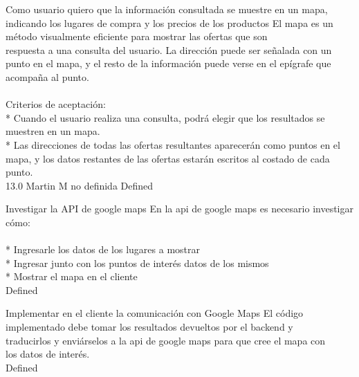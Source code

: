 \vspace{20pt}

	{Como usuario quiero que la información consultada se muestre en un mapa, indicando los lugares de compra y los precios de los productos} %
	{El mapa es un método visualmente eficiente para mostrar las ofertas que son\\
respuesta a una consulta del usuario. La dirección puede ser señalada con un\\
punto en el mapa, y el resto de la información puede verse en el epígrafe que\\
acompaña al punto.\\
  \\
Criterios de aceptación:\\
* Cuando el usuario realiza una consulta, podrá elegir que los resultados se muestren en un mapa.  \\
* Las direcciones de todas las ofertas resultantes aparecerán como puntos en el mapa, y los datos restantes de las ofertas estarán escritos al costado de cada punto.\\
} %
	{} %
	{13.0} %
	{Martin M} %
	{no definida} %
	{Defined} %

		{Investigar la API de google maps} %
		{En la api de google maps es necesario investigar cómo:\\
  \\
* Ingresarle los datos de los lugares a mostrar\\
* Ingresar junto con los puntos de interés datos de los mismos\\
* Mostrar el mapa en el cliente\\
} %
		{} %
		{} %
		{} %
		{Defined} %

		{Implementar en el cliente la comunicación con Google Maps} %
		{El código implementado debe tomar los resultados devueltos por el backend y\\
traducirlos y enviárselos a la api de google maps para que cree el mapa con\\
los datos de interés.\\
} %
		{} %
		{} %
		{} %
		{Defined} %

